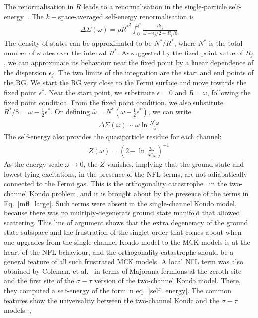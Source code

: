\documentclass[reprint,prb,superscriptaddress]{revtex4-1}
\begin{document}
The renormalisation in \(R\) leads to a renormalisation in the single-particle self-energy~\cite{anirbanmott1}. The \(k-\)space-averaged self-energy renormalisation is
\begin{equation}\begin{aligned}
	\Delta \Sigma(\omega) = \rho {R^*}^2\int_0^{\epsilon^*} \frac{d\epsilon_j}{\omega - \epsilon_j/2 + R_j/8}
\end{aligned}\end{equation}
The density of states can be approximated to be \(N^*/R^*\), where \(N^*\) is the total number of states over the interval \(R^*\). As suggested by the fixed point value of \(R_j\), we can approximate its behaviour near the fixed point by a linear dependence of the dispersion \(\epsilon_j\). The two limits of the integration are the start and end points of the RG. We start the RG very close to the Fermi surface and move towards the fixed point \(\epsilon^*\). Near the start point, we substitute \(\epsilon = 0\) and \(R = \omega\), following the fixed point condition. From the fixed point condition, we also substitute \(R^*/8 = \omega - \frac{1}{2}\epsilon^*\). On defining \(\bar \omega = N^* \left(\omega - \frac{1}{2}\epsilon^*\right)\), we can write
\begin{equation}\begin{aligned}
	\label{self_energy}
	\Delta \Sigma(\omega) \sim  \bar \omega \ln \frac{N^* \omega}{\bar \omega}
\end{aligned}\end{equation}
The self-energy also provides the quasiparticle residue for each channel\cite{anirbanmott1}:
\begin{equation}\begin{aligned}
	Z(\bar\omega) = \left(2 - \ln \frac{2\bar\omega}{N^* \omega}\right) ^{-1}
\end{aligned}\end{equation}
{As the energy scale \(\omega \to 0\), the \(Z\) vanishes, implying that the ground state and lowest-lying excitations, in the presence of the NFL terms, are not adiabatically connected to the Fermi gas. This is the orthogonality catastrophe~\cite{varma2002singular,anderson_infraredcat,yamada_catastrophe,yamada1979orthogonality} in the two-channel Kondo problem, and it is brought about by the presence of the terms in Eq.~\ref{mfl_large}}. Such terms were absent in the single-channel Kondo model, because there was no multiply-degenerate ground state manifold that allowed scattering. This line of argument shows that the extra degeneracy of the ground state subspace and the frustration of the singlet order that comes about when one upgrades from the single-channel Kondo model to the MCK models is at the heart of the NFL behaviour, and the orthogonality catastrophe should be a general feature of all such frustrated MCK models. A local NFL term was also obtained by Coleman, et al.~\cite{Coleman_tsvelik} in terms of Majorana fermions at the zeroth site and the first site of the \(\sigma-\tau\) version of the two-channel Kondo model. There, they computed a self-energy of the form in eq.~\ref{self_energy}. The common features show the universality between the two-channel Kondo and the \(\sigma-\tau\) models. 
,
\end{document}
